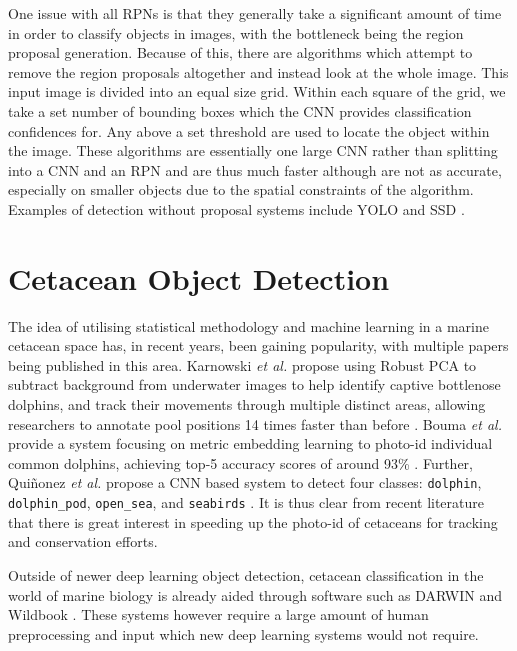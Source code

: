 One issue with all RPNs is that they generally take a significant amount of time in order to classify objects in images, with the bottleneck being the region proposal generation. Because of this, there are algorithms which attempt to remove the region proposals altogether and instead look at the whole image. This input image is divided into an equal size grid. Within each square of the grid, we take a set number of bounding boxes which the CNN provides classification confidences for. Any above a set threshold are used to locate the object within the image. These algorithms are essentially one large CNN rather than splitting into a CNN and an RPN and are thus much faster although are not as accurate, especially on smaller objects due to the spatial constraints of the algorithm. Examples of detection without proposal systems include YOLO \cite{redmon_you_2016} and SSD \cite{liu_ssd:_2016}. 

\section{Cetacean Object Detection}\label{ch:Background,sec:cetaceanDetection}

The idea of utilising statistical methodology and machine learning in a marine cetacean space has, in recent years, been gaining popularity, with multiple papers being published in this area. Karnowski \textit{et al.} propose using Robust PCA to subtract background from underwater images to help identify captive bottlenose dolphins, and track their movements through multiple distinct areas, allowing researchers to annotate pool positions 14 times faster than before \cite{karnowski_dolphin_2015}. Bouma \textit{et al.} provide a system focusing on metric embedding learning to photo-id individual common dolphins, achieving top-5 accuracy scores of around 93\% \cite{bouma_individual_2018}. Further, Qui\~{n}onez \textit{et al.} propose a CNN based system to detect four classes: \texttt{dolphin}, \texttt{dolphin\_pod}, \texttt{open\_sea}, and \texttt{seabirds} \cite{quinonez_using_2019}. It is thus clear from recent literature that there is great interest in speeding up the photo-id of cetaceans for tracking and conservation efforts. 

Outside of newer deep learning object detection, cetacean classification in the world of marine biology is already aided through software such as DARWIN \cite{stewman_iterative_2006} and Wildbook \cite{berger-wolf_wildbook:_2017-1}. These systems however require a large amount of human preprocessing and input which new deep learning systems would not require.


